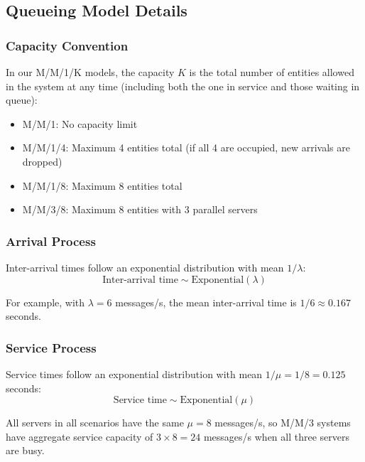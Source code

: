 \documentclass[12pt]{article}
\begin{document}
\subsection{Queueing Model Details}

\subsubsection{Capacity Convention}

In our M/M/1/K models, the capacity $K$ is the total number of entities allowed in the system at any time (including both the one in service and those waiting in queue):
\begin{itemize}
    \item M/M/1: No capacity limit
    \item M/M/1/4: Maximum 4 entities total (if all 4 are occupied, new arrivals are dropped)
    \item M/M/1/8: Maximum 8 entities total
    \item M/M/3/8: Maximum 8 entities with 3 parallel servers
\end{itemize}

\subsubsection{Arrival Process}

Inter-arrival times follow an exponential distribution with mean $1/\lambda$:
\begin{equation}
    \text{Inter-arrival time} \sim \text{Exponential}(\lambda)
\end{equation}

For example, with $\lambda = 6$ messages/s, the mean inter-arrival time is $1/6 \approx 0.167$ seconds.

\subsubsection{Service Process}

Service times follow an exponential distribution with mean $1/\mu = 1/8 = 0.125$ seconds:
\begin{equation}
    \text{Service time} \sim \text{Exponential}(\mu)
\end{equation}

All servers in all scenarios have the same $\mu = 8$ messages/s, so M/M/3 systems have aggregate service capacity of $3 \times 8 = 24$ messages/s when all three servers are busy.
\end{document}
